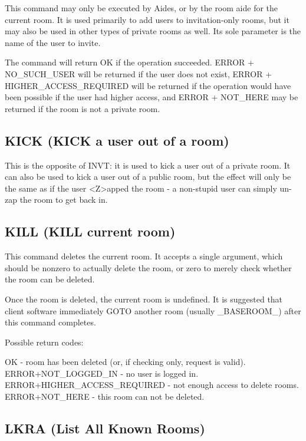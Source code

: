  This command may only be executed by Aides, or by the room aide for the
current room.  It is used primarily to add users to invitation-only rooms,
but it may also be used in other types of private rooms as well.  Its sole
parameter is the name of the user to invite.

 The command will return OK if the operation succeeded.  ERROR + NO_SUCH_USER
will be returned if the user does not exist, ERROR + HIGHER_ACCESS_REQUIRED
will be returned if the operation would have been possible if the user had
higher access, and ERROR + NOT_HERE may be returned if the room is not a
private room.



\subsection{KICK (KICK a user out of a room)}

 This is the opposite of INVT: it is used to kick a user out of a private
room.  It can also be used to kick a user out of a public room, but the
effect will only be the same as if the user <Z>apped the room - a non-stupid
user can simply un-zap the room to get back in.



\subsection{KILL (KILL current room)}

 This command deletes the current room.  It accepts a single argument, which
should be nonzero to actually delete the room, or zero to merely check
whether the room can be deleted.

 Once the room is deleted, the current room is undefined.  It is suggested
that client software immediately GOTO another room (usually _BASEROOM_)
after this command completes.

 Possible return codes:

 OK  -  room has been deleted (or, if checking only, request is valid).
 ERROR+NOT_LOGGED_IN  -  no user is logged in.
 ERROR+HIGHER_ACCESS_REQUIRED  -  not enough access to delete rooms.
 ERROR+NOT_HERE  -  this room can not be deleted.



\subsection{LKRA (List All Known Rooms)}

